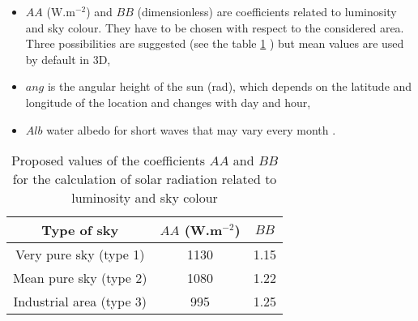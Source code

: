 \begin{itemize}
\item $AA$ ($\mathrm{{W}.m^{-2}}$) and $BB$ (dimensionless) are coefficients
related to luminosity and sky colour. They have to be chosen with respect to the
considered area. Three possibilities are suggested (see the table \ref{tab_sky_type}%
) but mean values are used by default in 3D,
\item $ang$ is the angular height of the sun (rad), which depends on the latitude and
longitude of the location and changes with day and hour,
\item $Alb$ water albedo for short waves that may vary every month
\cite{payne_albedo_1972}.
\end{itemize}

\begin{table}[ptbh]
\caption{Proposed values of the coefficients $AA$ and $BB$ for the calculation of solar
radiation related to luminosity and sky colour }%
\label{tab_sky_type}%
\centering
\begin{tabular}
[c]{|c|c|c|}\hline
Type of sky & $AA$ (W.m$^{-2}$) & $BB$\\\hline
Very pure sky (type 1) & 1130 & 1.15\\\hline
Mean pure sky (type 2) & 1080 & 1.22\\\hline
Industrial area (type 3) & 995 & 1.25\\\hline
\end{tabular}
\end{table}

